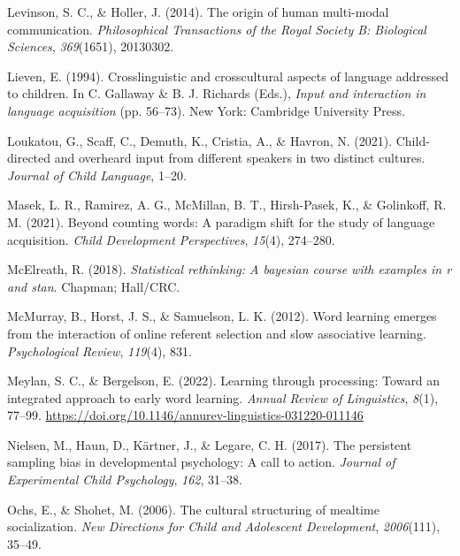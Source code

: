 \documentclass[
  man,floatsintext]{apa6}
\newlength{\cslhangindent}
\newlength{\cslentryspacingunit} %
\newenvironment{CSLReferences}[2] %
 {%
  \setlength{\parindent}{0pt}
  \ifodd #1
  \let\oldpar\par
  \def\par{\hangindent=\cslhangindent\oldpar}
  \fi
  \setlength{\parskip}{#2\cslentryspacingunit}
 }%
 {}
\begin{document}
\begin{CSLReferences}{1}{0}
\leavevmode{}%
Levinson, S. C., \& Holler, J. (2014). The origin of human multi-modal communication. \emph{Philosophical Transactions of the Royal Society B: Biological Sciences}, \emph{369}(1651), 20130302.

\leavevmode{}%
Lieven, E. (1994). Crosslinguistic and crosscultural aspects of language addressed to children. In C. Gallaway \& B. J. Richards (Eds.), \emph{Input and interaction in language acquisition} (pp. 56--73). New York: Cambridge University Press.

\leavevmode{}%
Loukatou, G., Scaff, C., Demuth, K., Cristia, A., \& Havron, N. (2021). Child-directed and overheard input from different speakers in two distinct cultures. \emph{Journal of Child Language}, 1--20.

\leavevmode{}%
Masek, L. R., Ramirez, A. G., McMillan, B. T., Hirsh-Pasek, K., \& Golinkoff, R. M. (2021). Beyond counting words: A paradigm shift for the study of language acquisition. \emph{Child Development Perspectives}, \emph{15}(4), 274--280.

\leavevmode{}%
McElreath, R. (2018). \emph{Statistical rethinking: A bayesian course with examples in r and stan}. Chapman; Hall/CRC.

\leavevmode{}%
McMurray, B., Horst, J. S., \& Samuelson, L. K. (2012). Word learning emerges from the interaction of online referent selection and slow associative learning. \emph{Psychological Review}, \emph{119}(4), 831.

\leavevmode{}%
Meylan, S. C., \& Bergelson, E. (2022). Learning through processing: Toward an integrated approach to early word learning. \emph{Annual Review of Linguistics}, \emph{8}(1), 77--99. \url{https://doi.org/10.1146/annurev-linguistics-031220-011146}

\leavevmode{}%
Nielsen, M., Haun, D., Kärtner, J., \& Legare, C. H. (2017). The persistent sampling bias in developmental psychology: A call to action. \emph{Journal of Experimental Child Psychology}, \emph{162}, 31--38.

\leavevmode{}%
Ochs, E., \& Shohet, M. (2006). The cultural structuring of mealtime socialization. \emph{New Directions for Child and Adolescent Development}, \emph{2006}(111), 35--49.


\end{CSLReferences}
\end{document}
